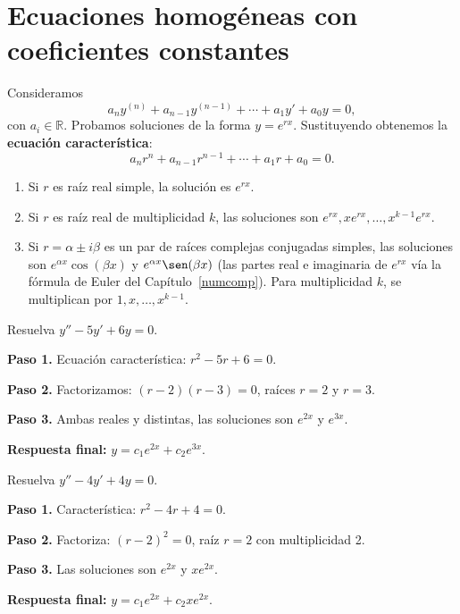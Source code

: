 \section{Ecuaciones homogéneas con coeficientes constantes}

Consideramos
\[
a_n y^{(n)} + a_{n-1} y^{(n-1)} + \cdots + a_1 y' + a_0 y = 0,
\]
con $a_i \in \mathbb{R}$. Probamos soluciones de la forma $y = e^{rx}$. Sustituyendo obtenemos la \textbf{ecuación característica}:
\[
a_n r^n + a_{n-1} r^{n-1} + \cdots + a_1 r + a_0 = 0.
\]

\begin{theorem}
\begin{enumerate}
\item Si $r$ es raíz real simple, la solución es $e^{rx}$.
\item Si $r$ es raíz real de multiplicidad $k$, las soluciones son $e^{rx}, x e^{rx}, \ldots, x^{k-1} e^{rx}$.
\item Si $r = \alpha \pm i\beta$ es un par de raíces complejas conjugadas simples, las soluciones son $e^{\alpha x}\cos(\beta x)$ y $e^{\alpha x}\sen(\beta x)$ (las partes real e imaginaria de $e^{rx}$ vía la fórmula de Euler del Capítulo~\ref{numcomp}). Para multiplicidad $k$, se multiplican por $1, x, \ldots, x^{k-1}$.
\end{enumerate}
\end{theorem}

\begin{example}
Resuelva $y'' - 5y' + 6y = 0$.

\begin{myproof}
\textbf{Paso 1.} Ecuación característica: $r^2 - 5r + 6 = 0$.

\textbf{Paso 2.} Factorizamos: $(r-2)(r-3)=0$, raíces $r=2$ y $r=3$.

\textbf{Paso 3.} Ambas reales y distintas, las soluciones son $e^{2x}$ y $e^{3x}$.

\textbf{Respuesta final:} $\boxed{y = c_1 e^{2x} + c_2 e^{3x}.}$
\end{myproof}
\end{example}

\begin{example}
Resuelva $y'' - 4y' + 4y = 0$.

\begin{myproof}
\textbf{Paso 1.} Característica: $r^2 - 4r + 4 = 0$.

\textbf{Paso 2.} Factoriza: $(r-2)^2 = 0$, raíz $r=2$ con multiplicidad 2.

\textbf{Paso 3.} Las soluciones son $e^{2x}$ y $x e^{2x}$.

\textbf{Respuesta final:} $\boxed{y = c_1 e^{2x} + c_2 x e^{2x}.}$
\end{myproof}
\end{example}

